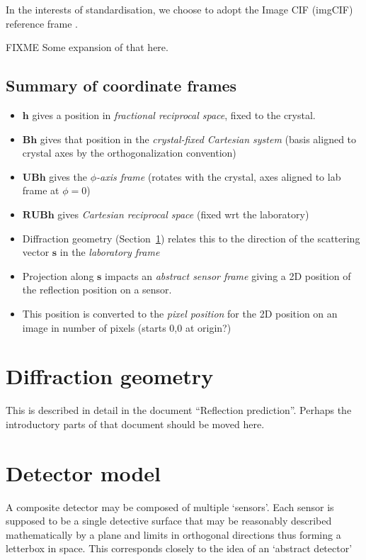 \documentclass[a4paper, 11pt]{article}
\renewcommand{\vec}[1]{\mathbf{#1}}
\begin{document}
In the interests of standardisation, we choose to adopt the Image CIF (imgCIF)
reference frame \citep{Berstein2006imagedata, Hammersley2006imgCIF}.

FIXME Some expansion of that here.

\subsection{Summary of coordinate frames}
\begin{itemize}
 \item $\vec{h}$ gives a position in \emph{fractional reciprocal space}, fixed 
       to the crystal.
 \item $\mathbf{B}\vec{h}$ gives that position in the \emph{crystal-fixed Cartesian system}
       (basis aligned to crystal axes by the orthogonalization convention)
 \item $\mathbf{UB}\vec{h}$ gives the \emph{$\phi$-axis frame} (rotates with the crystal, axes
       aligned to lab frame at $\phi=0$)
 \item $\mathbf{RUB}\vec{h}$ gives \emph{Cartesian reciprocal space} (fixed wrt the laboratory)
 \item Diffraction geometry (Section~\ref{sec:diff_geom}) relates this to the direction of
       the scattering vector $\vec{s}$ in the \emph{laboratory frame}
 \item Projection along $\vec{s}$ impacts an \emph{abstract sensor frame}
       giving a 2D position of the reflection position on a sensor.
 \item This position is converted to the \emph{pixel position} for the 2D position
       on an image in number of pixels (starts 0,0 at origin?)
\end{itemize}

\section{Diffraction geometry} \label{sec:diff_geom}

This is described in detail in the document ``Reflection prediction''. Perhaps
the introductory parts of that document should be moved here.

\section{Detector model}

A composite detector may be composed of multiple `sensors'. Each sensor is supposed to be a single
detective surface that may be reasonably described mathematically by a plane and limits in orthogonal
directions thus forming a letterbox in space. This corresponds closely to the idea of an `abstract
detector' 
\end{document}
